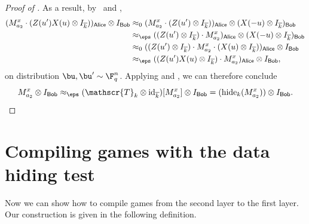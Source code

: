 \documentclass[11pt]{article}
\newcommand{\twirl}{\mathscr{T}}
\newcommand{\reg}[1]{{\mathsf{#1}}}
\newcommand{\hide}[2]{\mathrm{hide}_{#1}(#2)}
\begin{document}
\begin{proof}[Proof of ]
As a result, by~ and ,
\begin{align*}
(M_{a_2}^x \cdot (Z(u') X(u)\otimes I_{\overline{k}}))_{\reg{Alice}} \otimes I_{\reg{Bob}}
& \approx_{0}(M_{a_2}^x \cdot (Z(u')\otimes I_{\overline{k}}))_{\reg{Alice}} \otimes (X(-u)\otimes I_{\overline{k}})_{\reg{Bob}}\\
& \approx_{\eps}((Z(u')\otimes I_{\overline{k}}) \cdot M_{a_2}^x)_{\reg{Alice}} \otimes (X(-u)\otimes I_{\overline{k}})_{\reg{Bob}}\\
& \approx_{0}((Z(u')\otimes I_{\overline{k}}) \cdot M_{a_2}^x \cdot (X(u) \otimes I_{\overline{k}}))_{\reg{Alice}} \otimes I_{\reg{Bob}}\\
& \approx_{\eps}((Z(u') X(u)\otimes I_{\overline{k}}) \cdot M_{a_2}^x)_{\reg{Alice}} \otimes I_{\reg{Bob}},
\end{align*}
on distribution $\bu, \bu' \sim \F_q^n$.
Applying  and ,
we can therefore conclude
\begin{equation*}
M_{a_2}^x \otimes I_{\reg{Bob}}
\approx_{\eps} (\twirl_k \otimes \mathrm{id}_{\overline{k}})[M_{a_2}^x] \otimes I_{\reg{Bob}}
= (\hide{k}{M_{a_2}^x}) \otimes I_{\reg{Bob}}.\qedhere
\end{equation*}
\end{proof}





\section{Compiling games with the data hiding test}\label{sec:compile-sec}

Now we can show how to compile games from the second layer to the first layer.
Our construction is given in the following definition.
\end{document}
